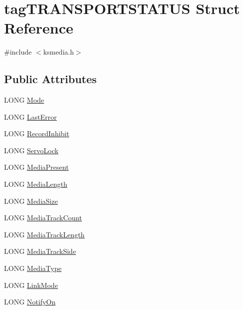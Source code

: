 \hypertarget{structtag_t_r_a_n_s_p_o_r_t_s_t_a_t_u_s}{}\section{tag\+T\+R\+A\+N\+S\+P\+O\+R\+T\+S\+T\+A\+T\+US Struct Reference}
\label{structtag_t_r_a_n_s_p_o_r_t_s_t_a_t_u_s}


{\ttfamily \#include $<$ksmedia.\+h$>$}

\subsection*{Public Attributes}
\begin{DoxyCompactItemize}
\item 
L\+O\+NG \hyperlink{structtag_t_r_a_n_s_p_o_r_t_s_t_a_t_u_s_ad9ba589f66c7933ebba5c2ba9c3fe8dd}{Mode}
\item 
L\+O\+NG \hyperlink{structtag_t_r_a_n_s_p_o_r_t_s_t_a_t_u_s_a1a1db20c730349cea6575dd83750e4ed}{Last\+Error}
\item 
L\+O\+NG \hyperlink{structtag_t_r_a_n_s_p_o_r_t_s_t_a_t_u_s_a2dc5baa27f80e1e3732fb9d3f5c04620}{Record\+Inhibit}
\item 
L\+O\+NG \hyperlink{structtag_t_r_a_n_s_p_o_r_t_s_t_a_t_u_s_a1ad9c0abb9b4e2f7c36df9ea4793885c}{Servo\+Lock}
\item 
L\+O\+NG \hyperlink{structtag_t_r_a_n_s_p_o_r_t_s_t_a_t_u_s_ab7d269b4c3059ccbab4077fef5730a74}{Media\+Present}
\item 
L\+O\+NG \hyperlink{structtag_t_r_a_n_s_p_o_r_t_s_t_a_t_u_s_a37d5662f20ca70a833d8ba3a952163b5}{Media\+Length}
\item 
L\+O\+NG \hyperlink{structtag_t_r_a_n_s_p_o_r_t_s_t_a_t_u_s_a673001d4a5aaf659e215bc30122578f2}{Media\+Size}
\item 
L\+O\+NG \hyperlink{structtag_t_r_a_n_s_p_o_r_t_s_t_a_t_u_s_a3256dbe815e58cd3805b3ecf5bede2f3}{Media\+Track\+Count}
\item 
L\+O\+NG \hyperlink{structtag_t_r_a_n_s_p_o_r_t_s_t_a_t_u_s_acc8819cdbee10a300a4702b1578f494f}{Media\+Track\+Length}
\item 
L\+O\+NG \hyperlink{structtag_t_r_a_n_s_p_o_r_t_s_t_a_t_u_s_a81f5247b861b2e68f109b36a3e85dac4}{Media\+Track\+Side}
\item 
L\+O\+NG \hyperlink{structtag_t_r_a_n_s_p_o_r_t_s_t_a_t_u_s_a15a4a25dabebcd0bb1b19ab96410cda1}{Media\+Type}
\item 
L\+O\+NG \hyperlink{structtag_t_r_a_n_s_p_o_r_t_s_t_a_t_u_s_afa3b46bb40c5ce016c8376d058b45b9d}{Link\+Mode}
\item 
L\+O\+NG \hyperlink{structtag_t_r_a_n_s_p_o_r_t_s_t_a_t_u_s_aad35617c1adcf442c2f8a789c8f1d9df}{Notify\+On}
\end{DoxyCompactItemize}


